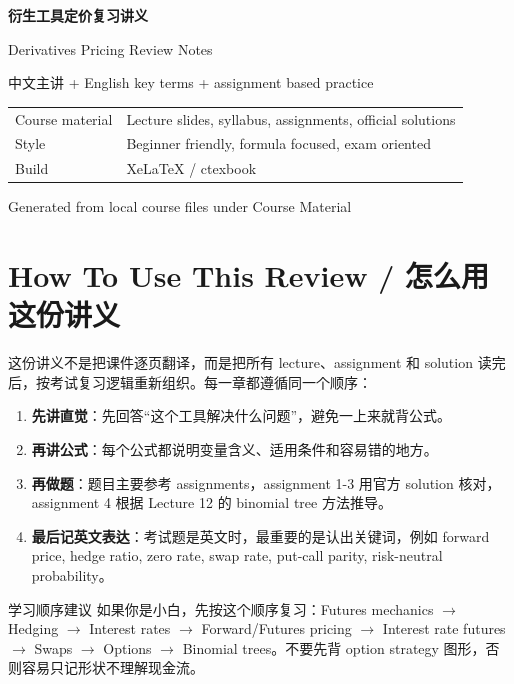 \documentclass[11pt,a4paper,openany]{ctexbook}
\begin{document}
\frontmatter
\begin{titlepage}
  \centering
  \vspace*{2cm}
  {\Huge\bfseries 衍生工具定价复习讲义\par}
  \vspace{0.5cm}
  {\Large Derivatives Pricing Review Notes\par}
  \vspace{1.2cm}
  {\large 中文主讲 + English key terms + assignment based practice\par}
  \vfill
  \begin{tabular}{ll}
    Course material & Lecture slides, syllabus, assignments, official solutions \\
    Style & Beginner friendly, formula focused, exam oriented \\
    Build & XeLaTeX / ctexbook \\
  \end{tabular}
  \vfill
  {\large Generated from local course files under Course Material\par}
\end{titlepage}

\tableofcontents

\chapter*{How To Use This Review / 怎么用这份讲义}

这份讲义不是把课件逐页翻译，而是把所有 lecture、assignment 和 solution 读完后，按考试复习逻辑重新组织。每一章都遵循同一个顺序：

\begin{enumerate}
  \item \textbf{先讲直觉}：先回答“这个工具解决什么问题”，避免一上来就背公式。
  \item \textbf{再讲公式}：每个公式都说明变量含义、适用条件和容易错的地方。
  \item \textbf{再做题}：题目主要参考 assignments，assignment 1-3 用官方 solution 核对，assignment 4 根据 Lecture 12 的 binomial tree 方法推导。
  \item \textbf{最后记英文表达}：考试题是英文时，最重要的是认出关键词，例如 forward price, hedge ratio, zero rate, swap rate, put-call parity, risk-neutral probability。
\end{enumerate}

\begin{warningbox}{学习顺序建议}
如果你是小白，先按这个顺序复习：Futures mechanics $\rightarrow$ Hedging $\rightarrow$ Interest rates $\rightarrow$ Forward/Futures pricing $\rightarrow$ Interest rate futures $\rightarrow$ Swaps $\rightarrow$ Options $\rightarrow$ Binomial trees。不要先背 option strategy 图形，否则容易只记形状不理解现金流。
\end{warningbox}
\end{document}
